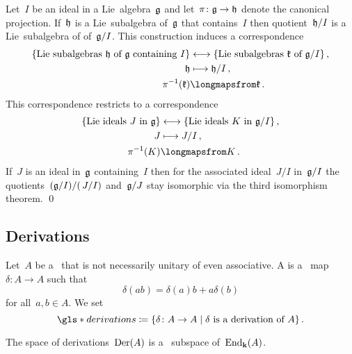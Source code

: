 \begin{proposition}
  \label{correspondence theorem!for Lie algebras}
  Let~$I$ be an ideal in a Lie~algebra~$\mathfrak{g}$ and let~$\pi \colon \mathfrak{g} \to \mathfrak{h}$ denote the canonical projection.
  If~$\mathfrak{h}$ is a Lie~subalgebra of~$\mathfrak{g}$ that contains~$I$ then quotient~$\mathfrak{h}/I$ is a Lie~subalgebra of of~$\mathfrak{g}/I$.
  This construction induces a {\onetoone} correspondence
  \begin{align*}
    \{ \text{Lie~subalgebras~$\hlie$ of~$\glie$ containing~$I$} \}
    &\longleftrightarrow
    \{ \text{Lie~subalgebras~$\klie$ of~$\glie/I$} \} \,,
    \\
    \hlie
    &\longmapsto
    \hlie/I \,,
    \\
    \pi^{-1}(\klie)
    &\longmapsfrom
    \klie \,.
  \end{align*}
  This correspondence restricts to a {\onetoone} correspondence
  \begin{align*}
    \{ \text{Lie~ideals~$J$ in~$\glie$} \}
    &\longleftrightarrow
    \{ \text{Lie~ideals~$K$ in~$\glie/I$} \} \,,
    \\
    J
    &\longmapsto
    J/I \,,
    \\
    \pi^{-1}(K)
    &\longmapsfrom
    K \,.
  \end{align*}
  If~$J$ is an ideal in~$\mathfrak{g}$ containing~$I$ then for the associated ideal~$J/I$ in~$\mathfrak{g}/I$ the quotients~$(\mathfrak{g}/I)/(\, J/I)$ and~$\mathfrak{g}/J$ stay isomorphic via the third isomorphism theorem.
  \qed
\end{proposition}





\subsection{Derivations}


\begin{definition}
  Let~$A$ be a~{\algebra{$\kf$}} that is not necessarily unitary of even associative.
  A  is a~{\linear{$\kf$}} map~$\delta \colon A \to A$ such that
  \[
    \delta(ab)
    =
    \delta(a) b + a \delta(b)
  \]
  for all~$a, b \in A$.
  We set
  \[
    \gls*{derivations}
    \defined
    \{
      \delta
      \colon
      A
      \to
      A
    \suchthat
      \text{$\delta$ is a derivation of~$A$}
    \}  \,.
  \]
\end{definition}


\begin{remark}
  The space of derivations~$\operatorname{Der}(A)$ is a~{\linear{$\kf$}} subspace of~$\operatorname{End}_{\mathbf{k}}(A)$.
\end{remark}


